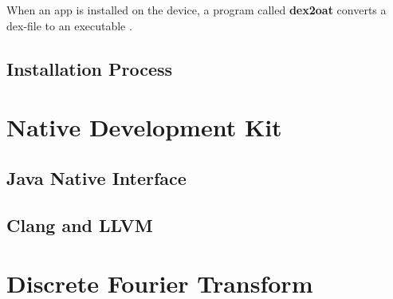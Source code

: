 When an app is installed on the device, a program called \textbf{dex2oat} converts a dex-file to an executable \cite{android:art:dalvik}.


\subsection{Installation Process}



\section{Native Development Kit}

\subsection{Java Native Interface}

\subsection{Clang and LLVM}

\section{Discrete Fourier Transform}

